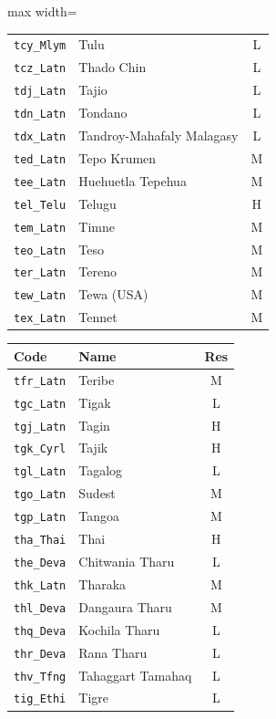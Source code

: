 {\begin{adjustbox}{max width=\textwidth}
\begin{tabular}{llc}
        \texttt{tcy\_Mlym} & Tulu & L \\
        \texttt{tcz\_Latn} & Thado Chin & L \\
        \texttt{tdj\_Latn} & Tajio & L \\
        \texttt{tdn\_Latn} & Tondano & L \\
        \texttt{tdx\_Latn} & Tandroy-Mahafaly Malagasy & L \\
        \texttt{ted\_Latn} & Tepo Krumen & M \\
        \texttt{tee\_Latn} & Huehuetla Tepehua & M \\
        \texttt{tel\_Telu} & Telugu & H \\
        \texttt{tem\_Latn} & Timne & M \\
        \texttt{teo\_Latn} & Teso & M \\
        \texttt{ter\_Latn} & Tereno & M \\
        \texttt{tew\_Latn} & Tewa (USA) & M \\
        \texttt{tex\_Latn} & Tennet & M \\
        \bottomrule
    \end{tabular}
    \quad
    \begin{tabular}{llc}
        \toprule
        \textbf{Code} & \textbf{Name} & \textbf{Res}\\
        \midrule
        \texttt{tfr\_Latn} & Teribe & M \\
        \texttt{tgc\_Latn} & Tigak & L \\
        \texttt{tgj\_Latn} & Tagin & H \\
        \texttt{tgk\_Cyrl} & Tajik & H \\
        \texttt{tgl\_Latn} & Tagalog & L \\
        \texttt{tgo\_Latn} & Sudest & M \\
        \texttt{tgp\_Latn} & Tangoa & M \\
        \texttt{tha\_Thai} & Thai & H \\
        \texttt{the\_Deva} & Chitwania Tharu & L \\
        \texttt{thk\_Latn} & Tharaka & M \\
        \texttt{thl\_Deva} & Dangaura Tharu & M \\
        \texttt{thq\_Deva} & Kochila Tharu & L \\
        \texttt{thr\_Deva} & Rana Tharu & L \\
        \texttt{thv\_Tfng} & Tahaggart Tamahaq & L \\
        \texttt{tig\_Ethi} & Tigre & L \\

\end{tabular}
\end{adjustbox}}
